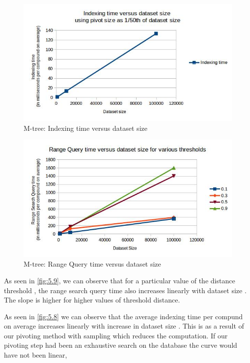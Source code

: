 \begin{figure}[ht!]	
\centering
\includegraphics[width=1 \columnwidth]{img/image6.jpg}
\caption{M-tree: Indexing time versus dataset size}
\label{fig:5.8}
\end{figure}

\begin{figure}[ht!]	
\centering
\includegraphics[width=1 \columnwidth]{img/image9.jpg}
\caption{M-tree: Range Query time versus dataset size}
\label{fig:5.9}
\end{figure}


As seen in \autoref{fig:5.9}, we can observe that for a particular value of the distance threshold , the range search query time also increases linearly with dataset size . The slope is higher for higher values of threshold distance.

As seen in \autoref{fig:5.8} we can observe that the average indexing time per compund on average increases linearly with increase in dataset size . This is as a result of our pivoting method with sampling which reduces the computation. If our pivoting step had been an exhaustive search on the database the curve would have not been linear, 






